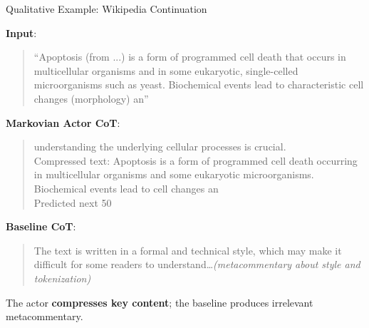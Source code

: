 \documentclass[aspectratio=169]{beamer}
\begin{document}
\begin{frame}{Qualitative Example: Wikipedia Continuation}

\textbf{Input}:
\begin{quote}
\small
``Apoptosis (from ...) is a form of programmed cell death that occurs in multicellular organisms and in some eukaryotic, single-celled microorganisms such as yeast. Biochemical events lead to characteristic cell changes (morphology) an''
\end{quote}

\bigskip
\textbf{Markovian Actor CoT}:
\begin{quote}
\small
understanding the underlying cellular processes is crucial.\\
Compressed text: Apoptosis is a form of programmed cell death occurring in multicellular organisms and some eukaryotic microorganisms. Biochemical events lead to cell changes an\\
Predicted next 50
\end{quote}

\textbf{Baseline CoT}:
\begin{quote}
\small
The text is written in a formal and technical style, which may make it difficult for some readers to understand\ldots \textit{(metacommentary about style and tokenization)}
\end{quote}

\bigskip
The actor \textbf{compresses key content}; the baseline produces irrelevant metacommentary.
\end{frame}

%
%
%
\end{document}
